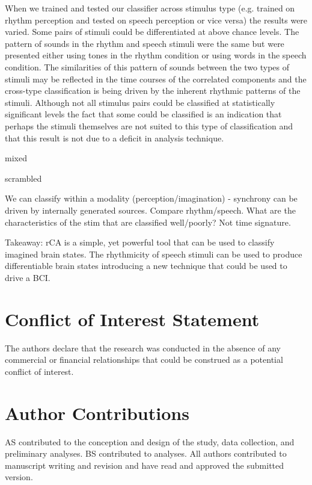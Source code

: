 \documentclass[utf8]{frontiersSCNS} %
\begin{document}
When we trained and tested our classifier across stimulus type (e.g. trained on rhythm perception and tested on speech perception or vice versa) the results were varied.
Some pairs of stimuli could be differentiated at above chance levels.
The pattern of sounds in the rhythm and speech stimuli were the same but were presented either using tones in the rhythm condition or using words in the speech condition.
The similarities of this pattern of sounds between the two types of stimuli may be reflected in the time courses of the correlated components and the cross-type classification is being driven by the inherent rhythmic patterns of the stimuli. 
Although not all stimulus pairs could be classified at statistically significant levels the fact that some could be classified is an indication that perhaps the stimuli themselves are not suited to this type of classification and that this result is not due to a deficit in analysis technique.

mixed

scrambled 

We can classify within a modality (perception/imagination) - synchrony can be driven by internally generated sources.
Compare rhythm/speech.
What are the characteristics of the stim that are classified well/poorly? Not time signature. 

Takeaway: rCA is a simple, yet powerful tool that can be used to classify imagined brain states. The rhythmicity of speech stimuli can be used to produce differentiable brain states introducing a new technique that could be used to drive a \ac{BCI}.


\section*{Conflict of Interest Statement}
The authors declare that the research was conducted in the absence of any commercial or financial relationships that could be construed as a potential conflict of interest.

\section*{Author Contributions}
AS contributed to the conception and design of the study, data collection, and preliminary analyses. BS contributed to analyses. All authors contributed to manuscript writing and revision and have read and approved the submitted version. 
\end{document}
